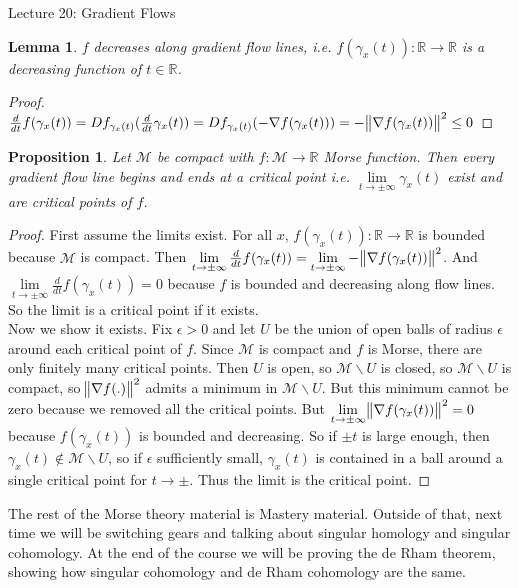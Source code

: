 \documentclass[10pt]{article}
\theoremstyle{plain}
\newtheorem{lemma}[thm]{Lemma}
\newtheorem{prop}[thm]{Proposition}
\theoremstyle{definition}
\newcommand{\Real}{\mathbb{R}}
\newcommand{\man}{\mathcal{M}}
\newcommand{\deriv}{d}
\newcommand{\dt}{\deriv t}
\newcommand{\tdiffof}[1]{\frac{\deriv #1}{\dt}}
\begin{document}
\begin{section}{Lecture 20: Gradient Flows}
\begin{lemma}
    $f$ decreases along gradient flow lines, i.e. $f(\gamma_x(t)):\Real \to \Real$ is a decreasing function of $t\in\Real$.
\end{lemma}
\begin{proof}
    $\tdiffof{} f(\gamma_x(t)) = Df_{\gamma_x(t)} (\tdiffof{} \gamma_x(t)) = Df_{\gamma_x(t)}(- \nabla f(\gamma_x(t))) = - \norm{\nabla f(\gamma_x(t))}^2 \leq 0$
\end{proof}

\begin{prop}
   Let $\man$ be compact with $f:\man\to\Real$ Morse function. Then every gradient flow line begins and ends at a critical point i.e. $\lim \limits_{t \to \pm \infty} \gamma_x(t) $ exist and are critical points of $f$.
\end{prop}

\begin{proof}
    First assume the limits exist. For all $x$, $f(\gamma_x(t)) : \Real \to \Real$ is bounded because $\man$ is compact. Then $\lim \limits_{t \to \pm \infty} \tdiffof{} f(\gamma_x(t)) = \lim \limits_{t \to \pm \infty} - \norm{\nabla f(\gamma_x(t))}^2$. And $\lim \limits_{t \to \pm \infty} \tdiffof{}f(\gamma_x(t)) = 0$ because $f$ is bounded and decreasing along flow lines. So the limit is a critical point if it exists.\\
    Now we show it exists. Fix $\epsilon> 0$ and let $U $ be the union of open balls of radius $\epsilon$ around each critical point of $f.$ Since $\man$ is compact and $f$ is Morse, there are only finitely many critical points. Then $U$ is open, so $\man \backslash U$ is closed, so $\man \backslash U$ is compact, so $\norm{\nabla f(.)}^2$ admits a minimum in $\man \backslash U$. But this minimum cannot be zero because we removed all the critical points. But $\lim \limits_{t \to \pm \infty}\norm{\nabla f(\gamma_x(t))}^2 = 0$ because $f(\gamma_x(t))$ is bounded and decreasing. So if $\pm t$ is large enough, then $\gamma_x(t) \not\in \man \backslash U$, so if $\epsilon $ sufficiently small, $\gamma_x(t)$ is contained in a ball around a single critical point for $t \to \pm$. Thus the limit is the critical point. 
\end{proof}
The rest of the Morse theory material is Mastery material. Outside of that, next time we will be switching gears and talking about singular homology and singular cohomology. At the end of the course we will be proving the de Rham theorem, showing how singular cohomology and de Rham cohomology are the same.

\end{section}
\end{document}
